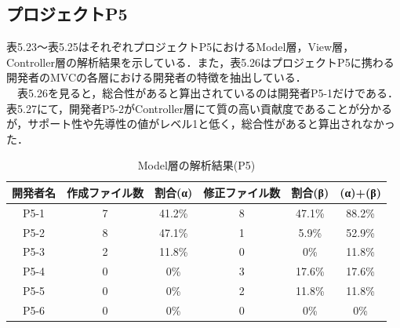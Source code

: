 \documentclass{funthesis}
\begin{document}
\subsection{プロジェクトP5}
表5.23〜表5.25はそれぞれプロジェクトP5におけるModel層，View層，Controller層の解析結果を示している．また，表5.26はプロジェクトP5に携わる開発者のMVCの各層における開発者の特徴を抽出している．
\\　表5.26を見ると，総合性があると算出されているのは開発者P5-1だけである．表5.27にて，開発者P5-2がController層にて質の高い貢献度であることが分かるが，サポート性や先導性の値がレベル1と低く，総合性があると算出されなかった．
\begin{table}[H]
  \begin{center}
\begin{tabular}{|c|c|c|c|c||c|}\hline
開発者名&作成ファイル数&割合(α)&修正ファイル数&割合(β)&(α)+(β)\\ \hline
P5-1 & 7 & 41.2\% & 8 & 47.1\% & 88.2\%\\ \hline \hline
P5-2 & 8 & 47.1\% & 1 & 5.9\% & 52.9\%\\ \hline \hline
P5-3 & 2 & 11.8\% & 0 & 0\% & 11.8\%\\ \hline \hline
P5-4 & 0 & 0\% & 3 & 17.6\% & 17.6\%\\ \hline \hline
P5-5 & 0 & 0\% & 2 & 11.8\% & 11.8\%\\ \hline \hline
P5-6 & 0 & 0\% & 0 & 0\% & 0\%\\ \hline 
\end{tabular}    
\caption{Model層の解析結果(P5)}    \label{sample}
  \end{center}
\end{table}
\end{document}
